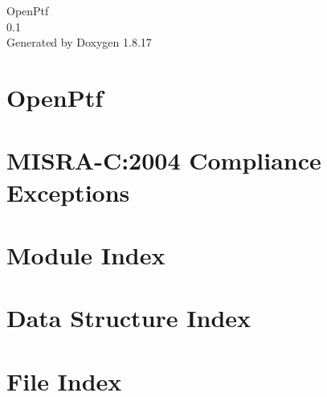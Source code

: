\let\mypdfximage\pdfximage\def\pdfximage{\immediate\mypdfximage}\documentclass[twoside]{book}
\newcommand{\+}{\discretionary{\mbox{\scriptsize$\hookleftarrow$}}{}{}}
\newcommand{\clearemptydoublepage}{%
  \newpage{\pagestyle{empty}\cleardoublepage}%
}
\begin{document}
\hypersetup{pageanchor=false,
             bookmarksnumbered=true,
             pdfencoding=unicode
            }
\begin{titlepage}
\vspace*{7cm}
\begin{center}%
{\Large Open\+Ptf \\[1ex]\large 0.\+1 }\\
\vspace*{1cm}
{\large Generated by Doxygen 1.8.17}\\
\end{center}
\end{titlepage}
\clearemptydoublepage
{}
\tableofcontents
\clearemptydoublepage
{}
\hypersetup{pageanchor=true}

\chapter{Open\+Ptf}
\label{index}\hypertarget{index}{}
\chapter{M\+I\+S\+R\+A-\/C\+:2004 Compliance Exceptions}
\label{_c_m_s_i_s__m_i_s_r_a__exceptions}

\chapter{Module Index}

\chapter{Data Structure Index}

\chapter{File Index}

\end{document}
